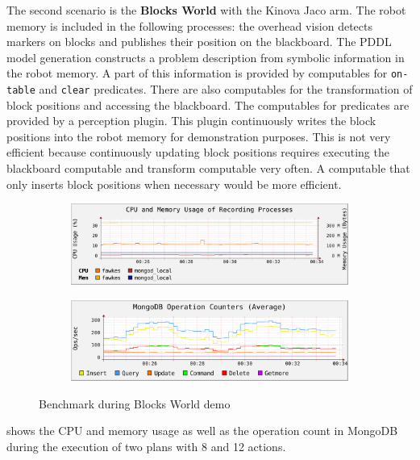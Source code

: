 \bigskip
The second scenario is the \textbf{Blocks World} with the Kinova Jaco arm. The
robot memory is included in the following processes: the overhead
vision detects markers on blocks and publishes their position on the
blackboard. The PDDL model generation constructs a problem description
from symbolic information in the robot memory. A part of this
information is provided by computables for \texttt{on-table} and
\texttt{clear} predicates. There are also computables for the
transformation of block positions and accessing the blackboard. The
computables for predicates are provided by a perception plugin. This
plugin continuously writes the block positions into the robot memory
for demonstration purposes. This is not very efficient because
continuously updating block positions requires executing the
blackboard computable and transform computable very often. A
computable that only inserts block positions when necessary would be
more efficient.

\begin{figure}
  \centering
  \begin{subfigure}[b]{1\textwidth}
    \includegraphics[width=\textwidth]{plots/blocksworld/cpu-mem}
    \label{fig:blocks-cpu-mem}
  \end{subfigure}
  \begin{subfigure}[b]{1\textwidth}
    \includegraphics[width=\textwidth]{plots/blocksworld/operations}
    \label{fig:blocks-ops}
  \end{subfigure}
  \caption[Benchmark during Blocks World demo]{Benchmark during Blocks World demo}
  \label{fig:blocks-benchmark}
\end{figure}
 shows the CPU and memory usage as well as the
operation count in MongoDB during the execution of two plans with 8
and 12 actions.

